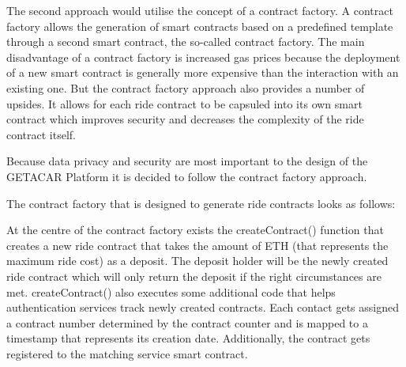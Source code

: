 The second approach would utilise the concept of a contract factory. A contract factory allows the generation of smart contracts based on a predefined template through a second smart contract, the so-called contract factory. The main disadvantage of a contract factory is increased gas prices because the deployment of a new smart contract is generally more expensive than the interaction with an existing one. But the contract factory approach also provides a number of upsides. It allows for each ride contract to be capsuled into its own smart contract which improves security and decreases the complexity of the ride contract itself. 

Because data privacy and security are most important to the design of the GETACAR Platform it is decided to follow the contract factory approach.

The contract factory that is designed to generate ride contracts looks as follows:

At the centre of the contract factory exists the createContract() function that creates a new ride contract that takes the amount of ETH (that represents the maximum ride cost) as a deposit. The deposit holder will be the newly created ride contract which will only return the deposit if the right circumstances are met. createContract() also executes some additional code that helps authentication services track newly created contracts. Each contact gets assigned a contract number determined by the contract counter and is mapped to a timestamp that represents its creation date. Additionally, the contract gets registered to the matching service smart contract.



